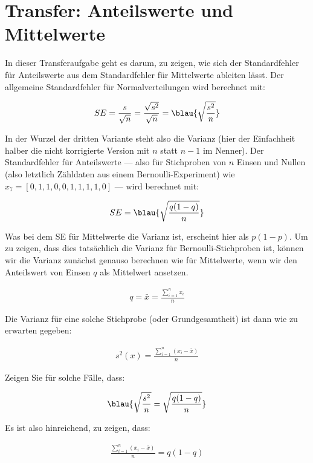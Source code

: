 \section{Transfer: Anteilswerte und Mittelwerte}

In dieser Transferaufgabe geht es darum, zu zeigen, wie sich der Standardfehler für Anteilswerte aus dem Standardfehler für Mittelwerte ableiten lässt.
Der allgemeine Standardfehler für Normalverteilungen wird berechnet mit:

\begin{align}
  SE=\frac{s}{\sqrt{n}}=\frac{\sqrt{s^2}}{\sqrt{n}}=\blau{\sqrt{\frac{s^2}{n}}}
\end{align}

In der Wurzel der dritten Variante steht also die Varianz (hier der Einfachheit halber die nicht korrigierte Version mit $n$ statt $n-1$ im Nenner).
Der Standardfehler für Anteilswerte --- also für Stichproben von $n$ Einsen und Nullen (also letztlich Zähldaten aus einem Bernoulli-Experiment) wie $x_7=[0,1,1,0,0,1,1,1,1,0]$ --- wird berechnet mit:

\begin{align}
  SE=\blau{\sqrt{\frac{q(1-q)}{n}}}
\end{align}

Was bei dem SE für Mittelwerte die Varianz ist, erscheint hier als $p(1-p)$.
Um zu zeigen, dass dies tatsächlich die Varianz für Bernoulli-Stichproben ist, können wir die Varianz zunächst genauso berechnen wie für Mittelwerte, wenn wir den Anteilswert von Einsen $q$ als Mittelwert ansetzen.

\begin{align}
  q=\bar{x}=\frac{\sum\limits_{i=1}^{n}x_i}{n}
\end{align}

Die Varianz für eine solche Stichprobe (oder Grundgesamtheit) ist dann wie zu erwarten gegeben:

\begin{align}
  s^2(x)=\frac{\sum\limits_{i=1}^{n}(x_i-\bar{x})}{n}
\end{align}

Zeigen Sie für solche Fälle, dass:

\begin{align}
  \blau{\sqrt{\frac{s^2}{n}}=\sqrt{\frac{q(1-q)}{n}}}
\end{align}

Es ist also hinreichend, zu zeigen, dass:

\begin{align}
  \frac{\sum\limits_{i=1}^{n}(x_i-\bar{x})}{n}=q(1-q)
\end{align}

